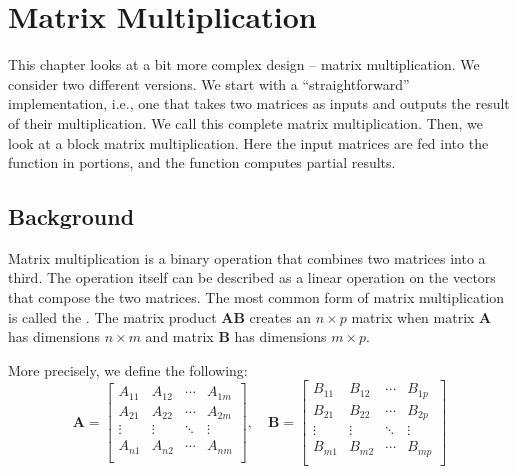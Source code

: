 
\chapter{Matrix Multiplication}
\glsresetall
\label{chapter:matrix_multiplication}

This chapter looks at a bit more complex design -- matrix multiplication. We consider two different versions. We start with a ``straightforward'' implementation, i.e., one that takes two matrices as inputs and outputs the result of their multiplication. We call this complete matrix multiplication. Then, we look at a block matrix multiplication. Here the input matrices are fed into the function in portions, and the function computes partial results.

\section{Background}

Matrix multiplication is a binary operation that combines two matrices into a third. The operation itself can be described as a linear operation on the vectors that compose the two matrices. The most common form of matrix multiplication is called the . The matrix product $\mathbf{AB}$ creates an $n \times p$ matrix when matrix $\mathbf{A}$ has dimensions $n \times m$ and matrix $\mathbf{B}$ has dimensions $m \times p$. 

More precisely, we define the following: \begin{equation}
\mathbf{A} =
 \begin{bmatrix}
  A_{11} & A_{12}  & \cdots & A_{1m} \\
  A_{21} & A_{22}  & \cdots & A_{2m} \\
  \vdots  & \vdots  &\ddots & \vdots  \\
    A_{n1} & A_{n2}  & \cdots & A_{nm} \\
 \end{bmatrix},  \quad
\mathbf{B} =
 \begin{bmatrix}
  B_{11} & B_{12}  & \cdots & B_{1p} \\
  B_{21} & B_{22}  & \cdots & B_{2p} \\
  \vdots  & \vdots   &\ddots & \vdots  \\
  B_{m1} & B_{m2}  & \cdots & B_{mp} \\
 \end{bmatrix}
\end{equation} 

